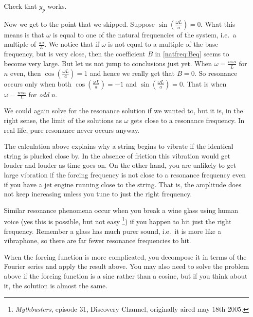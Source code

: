 \documentclass{ximera}
\begin{document}
\begin{exercise}
    Check that $y_p$ works.
\end{exercise}

Now we get to the point that we skipped.  Suppose $\sin ( \frac{\omega L}{a} ) = 0$.  What this means is that $\omega$ is equal to one of the natural frequencies of the system, i.e.\ a multiple of $\frac{\pi a}{L}$.  We notice that if $\omega$ is not equal to a multiple of the base frequency, but is very close, then the coefficient $B$ in \eqref{natfreq:Beq} seems to become very large.  But let us not jump to conclusions just yet. When $\omega = \frac{n \pi a}{L}$ for $n$ even, then $\cos (\frac{\omega L}{a}) = 1$ and hence we really get that $B=0$.  So resonance occurs only when  both $\cos (\frac{\omega L}{a}) = -1$ and $\sin (\frac{\omega L}{a}) = 0$.  That is when $\omega = \frac{n \pi a }{L}$ for \emph{odd} $n$.

We could again solve for the resonance solution if we wanted to, but it is, in the right sense, the limit of the solutions as $\omega$ gets close to a resonance frequency. In real life, pure resonance never occurs anyway.

The calculation above explains why a string begins to vibrate if the identical string is plucked close by.  In the absence of friction this vibration would get louder and louder as time goes on. On the other hand, you are unlikely to get large vibration if the forcing  frequency is not close to a resonance frequency even if you have a jet engine running close to the string.  That is, the amplitude does not keep increasing unless you tune to just the right frequency.

Similar resonance phenomena occur when you break a wine glass using human voice (yes this is possible, but not easy%
\footnote{\emph{Mythbusters}, episode 31, Discovery Channel, originally aired may 18th 2005.}) 
if you happen to hit just the right frequency.  Remember a glass has much purer sound, i.e.\ it is more like a vibraphone, so there are far fewer resonance frequencies to hit.

When the forcing function is more complicated, you decompose it in terms of the Fourier series and apply the result above.  You may also need to solve the problem above if the forcing function is a sine rather than a cosine, but if you think about it, the solution is almost the same.
\end{document}
